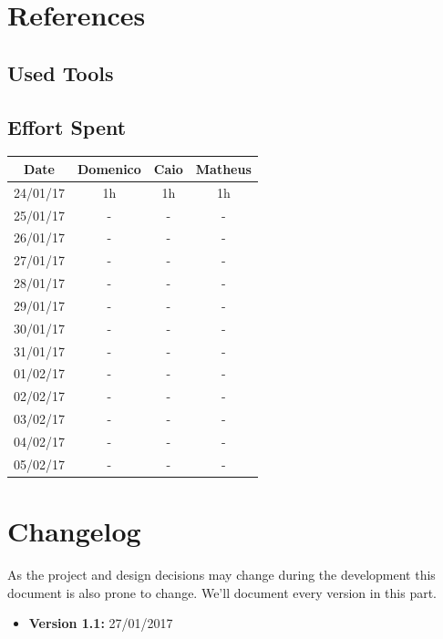 \documentclass[a4paper]{article}
\begin{document}
\section{References}
\subsection{Used Tools}
\newpage
\subsection{Effort Spent}
\begin{tabular}{ | c | c | c | c | }
\hline
	\textbf {Date} & \textbf {Domenico} & \textbf {Caio} & \textbf {Matheus} \\ \hline
	24/01/17& 1h & 1h & 1h  \\ \hline
	25/01/17& - & - & -  \\ \hline
	26/01/17& - & - & -  \\ \hline
	27/01/17& - & - & -  \\ \hline
	28/01/17& - & - & -  \\ \hline
	29/01/17& - & - & -  \\ \hline
	30/01/17& - & - & -  \\ \hline
	31/01/17& - & - & -  \\ \hline
	01/02/17& - & - & -  \\ \hline
	02/02/17& - & - & -  \\ \hline
	03/02/17& - & - & -  \\ \hline
	04/02/17& - & - & -  \\ \hline
	05/02/17& - & - & -  \\ \hline

\end{tabular}
\newpage

\section{Changelog}
As the project and design decisions may change during the development this document is also prone to change.
We'll document every version in this part.
\begin{itemize}
\item \textbf {Version 1.1:} 27/01/2017
\end{itemize}
\end{document}
